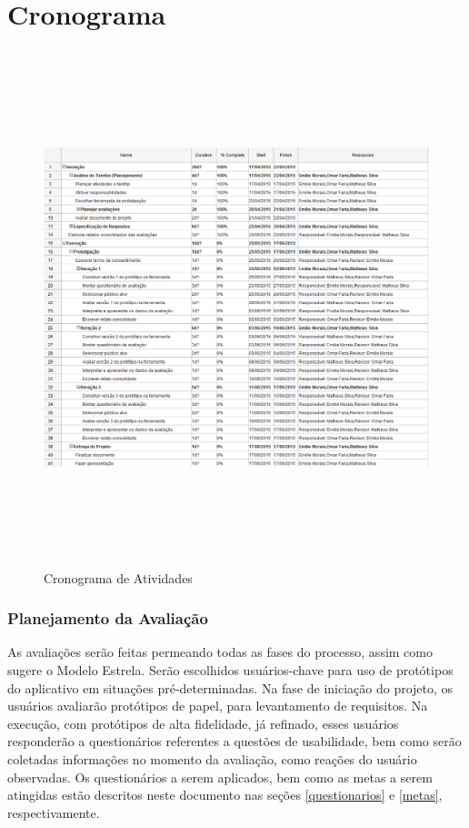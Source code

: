 \chapter[Cronograma]{Cronograma}

\graphicspath{{figuras/}}

\begin{figure}[!htb]
 \centering
 \includegraphics[width = 17.5cm, height = 15cm]{cronograma.png}
 \caption{Cronograma de Atividades}
 \label{Rotulo}

\end{figure}

\subsection{Planejamento da Avaliação}

As avaliações serão feitas permeando todas as fases do processo, assim como sugere o
Modelo Estrela. Serão escolhidos usuários-chave para uso de protótipos do aplicativo em
situações pré-determinadas. Na fase de iniciação do projeto, os usuários avaliarão protótipos
de papel, para levantamento de requisitos. Na execução, com protótipos de alta fidelidade, já
refinado, esses usuários responderão a questionários referentes a questões de usabilidade, bem
como serão coletadas informações no momento da avaliação, como reações do usuário
observadas. Os questionários a serem aplicados, bem como as metas a serem atingidas estão
descritos neste documento nas seções \ref{questionarios} e \ref{metas}, respectivamente.